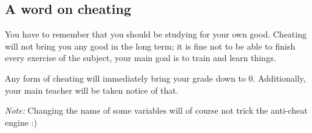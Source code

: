 \documentclass[12pt]{article}
\begin{document}
\subsection{A word on cheating}

You have to remember that you should be studying for your own good. Cheating will not bring you any good in the long term; it is fine not to be able to finish every exercise of the subject, your main goal is to train and learn things.

Any form of cheating will immediately bring your grade down to 0. Additionally, your main teacher will be taken notice of that.

\textit{Note:} Changing the name of some variables will of course not trick the anti-cheat engine :)
\end{document}
